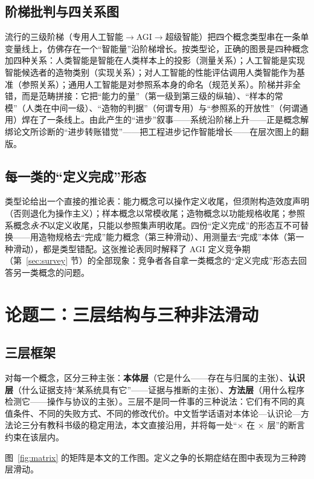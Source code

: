 \documentclass[10pt,fontset=fandol]{ctexart}
\begin{document}
\subsection{阶梯批判与四关系图}

流行的三级阶梯（专用人工智能$\to$AGI$\to$超级智能）把四个概念类型串在一条单变量线上，仿佛存在一个“智能量”沿阶梯增长。按类型论，正确的图景是四种概念加四种关系：人类智能是智能在人类样本上的投影（测量关系）；人工智能是实现智能候选者的造物类别（实现关系）；对人工智能的性能评估调用人类智能作为基准（参照关系）；通用人工智能是对参照系本身的命名（规范关系）。阶梯并非全错，而是范畴拼接：它把“能力的量”（第一级到第三级的纵轴）、“样本的常模”（人类在中间一级）、“造物的判据”（何谓专用）与“参照系的开放性”（何谓通用）焊在了一条线上。由此产生的“进步”叙事——系统沿阶梯上升——正是概念解绑论文所诊断的“进步转账错觉”——把工程进步记作智能增长——在层次图上的翻版\cite{yu2026twogoals}。

\subsection{每一类的“定义完成”形态}

类型论给出一个直接的推论表：能力概念可以操作定义收尾，但须附构造效度声明（否则退化为操作主义）；样本概念以常模收尾；造物概念以功能规格收尾；参照系概念\emph{永不}以定义收尾，只能以参照集声明收尾。四份“定义完成”的形态互不可替换——用造物规格去“完成”能力概念（第三种滑动）、用测量去“完成”本体（第一种滑动），都是类型错配。这张推论表同时解释了 AGI 定义竞争期（第~\ref{sec:survey} 节）的全部现象：竞争者各自拿一类概念的“定义完成”形态去回答另一类概念的问题。

\section{论题二：三层结构与三种非法滑动}\label{sec:layers}

\subsection{三层框架}

对每一个概念，区分三种主张：\textbf{本体层}（它是什么——存在与归属的主张）、\textbf{认识层}（什么证据支持“某系统具有它”——证据与推断的主张）、\textbf{方法层}（用什么程序检测它——操作与协议的主张）。三层不是同一件事的三种说法：它们有不同的真值条件、不同的失败方式、不同的修改代价。中文哲学话语对本体论—认识论—方法论三分有教科书级的稳定用法，本文直接沿用，并将每一处“$\times$ 在 $\times$ 层”的断言约束在该层内。

图~\ref{fig:matrix} 的矩阵是本文的工作图。定义之争的长期症结在图中表现为三种跨层滑动。
\end{document}
